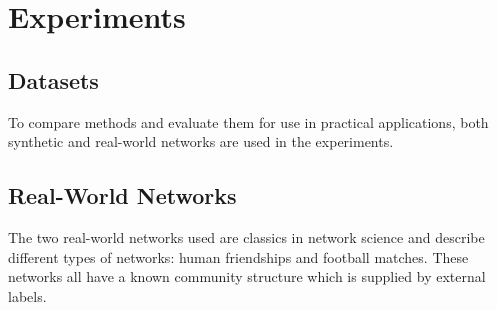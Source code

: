 \documentclass[\main/thesis.tex]{subfiles}
\begin{document}

\section{Experiments}
\subsection{Datasets}
To compare methods and evaluate them for use in practical applications, both synthetic and real-world networks are used in the experiments.
\subsection*{Real-World Networks}
The two real-world networks used are classics in network science and describe different types of networks: human friendships and football matches. These networks all have a known community structure which is supplied by external labels. 
\end{document}
